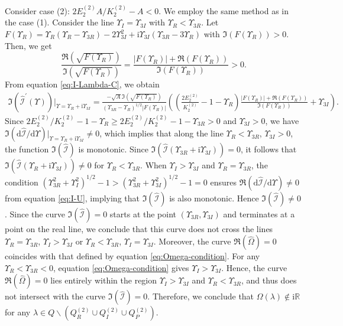 \documentclass[11pt,reqno]{amsart}
\newcommand{\ii}{\mathrm{i}}
\newcommand{\dd}{\mathrm{d}}
\numberwithin{equation}{section}
\begin{document}
\begin{proof-spec-cn}
	Consider case (2): $2E^{(2)}_2A/K^{(2)}_2-A<0$.
	We employ the same method as in the case (1). 
	Consider the line $\Upsilon_{I}=\Upsilon_{3I}$ with $\Upsilon_R<\Upsilon_{3R}$.
	Let $F(\Upsilon_R)=\Upsilon_R(\Upsilon_R-\Upsilon_{3R})-2\Upsilon_{3I}^2+\ii\Upsilon_{3I}(\Upsilon_{3R}-3\Upsilon_R)$ with $\Im(F(\Upsilon_R))>0$. Then, we get
	\begin{equation}\nonumber
		\frac{\Re(\sqrt{F(\Upsilon_R)})}{\Im(\sqrt{F(\Upsilon_R)})}=\frac{|F(\Upsilon_R)|+\Re(F(\Upsilon_R))}{\Im(F(\Upsilon_R))}>0.
	\end{equation}
	From equation \eqref{eq:I-Lambda-C}, we obtain
	\begin{equation}\nonumber
		\begin{split}
			\Im\left(\hat{\mathcal{I}}^{\prime}(\Upsilon) \right)|_{\Upsilon=\Upsilon_R+\ii \Upsilon_{3I}} \!
			=\frac{-\sqrt{A}\Im(\sqrt{F(\Upsilon_R)})}{(\Upsilon_{3R}-\Upsilon_R)^{1/2}|F(\Upsilon_R)|}\left(\left(\frac{2E_2^{(2)}}{K_2^{(2)}}-1-\Upsilon_{R}\right)\frac{|F(\Upsilon_R)|+\Re(F(\Upsilon_R))}{\Im(F(\Upsilon_R))}+\Upsilon_{3I}\right).
		\end{split}
	\end{equation}
	Since $2E_2^{(2)}/K_2^{(2)}-1-\Upsilon_{R}\ge 2E_2^{(2)}/K_2^{(2)}-1-\Upsilon_{3R}>0$ and $\Upsilon_{3I}>0$, we have $\Im(\dd \hat{\mathcal{I}}/ \dd \Upsilon)|_{\Upsilon=\Upsilon_R+\ii \Upsilon_{3I}}\neq 0$, which implies that along the line $\Upsilon_R<\Upsilon_{3R}$, $\Upsilon_{3I}>0$, the function $\Im(\hat{\mathcal{I}})$ is monotonic.
	Since $\Im(\hat{\mathcal{I}}(\Upsilon_{3R}+\ii \Upsilon_{3I}))=0$, it follows that $\Im(\hat{\mathcal{I}}(\Upsilon_{R}+\ii \Upsilon_{3I}))\neq 0$ for $\Upsilon_R<\Upsilon_{3R}$. 
	When $\Upsilon_{I}>\Upsilon_{3I}$ and $\Upsilon_R=\Upsilon_{3R}$, the condition $(\Upsilon_{3R}^2+\Upsilon_I^2)^{1/2}-1>(\Upsilon_{3R}^2+\Upsilon_{3I}^2)^{1/2}-1=0$ ensures $\Re(\dd \hat{\mathcal{I}}/ \dd \Upsilon)\neq 0$ from equation \eqref{eq:I-U}, implying that $\Im(\hat{\mathcal{I}})$ is also monotonic.
	Hence $\Im(\hat{\mathcal{I}})\neq 0$.
	Since the curve $\Im(\hat{\mathcal{I}})=0$ starts at the point $(\Upsilon_{3R},\Upsilon_{3I})$ and terminates at a point on the real line, we conclude that this curve does not cross the lines $\Upsilon_R=\Upsilon_{3R}$, $\Upsilon_{I}>\Upsilon_{3I}$ or  $\Upsilon_R<\Upsilon_{3R}$, $\Upsilon_{I}=\Upsilon_{3I}$.
	Moreover, the curve $\Re(\hat{\Omega})=0$ coincides with that defined by equation \eqref{eq:Omega-condition}. For any $\Upsilon_R<\Upsilon_{3R}<0$, equation \eqref{eq:Omega-condition} gives $\Upsilon_I>\Upsilon_{3I}$. 
	Hence, the curve $\Re(\hat{\Omega})=0$ lies entirely within the region $\Upsilon_I>\Upsilon_{3I}$ and $\Upsilon_R<\Upsilon_{3R}$, and thus does not intersect with the curve $\Im(\hat{\mathcal{I}})=0$.	
    Therefore, we conclude that $\Omega(\lambda)\notin \ii \mathbb{R}$ for any $\lambda \in Q\backslash(Q^{(2)}_{R} \cup Q^{(2)}_{I} \cup  Q^{(2)}_{P})$.
\end{proof-spec-cn}
\end{document}
